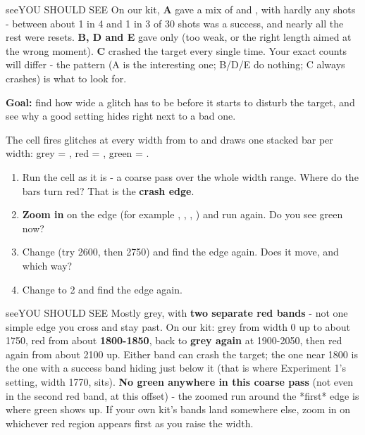 \documentclass[11pt,letterpaper]{article}
\begin{document}
\vspace{4pt}

\begin{guidecallout}{see}{YOU SHOULD SEE}
On our kit, \textbf{A} gave a mix of  and , with hardly any  shots - between
about 1 in 4 and 1 in 3 of 30 shots was a success, and nearly all the rest were resets. \textbf{B, D and E} gave only
 (too weak, or the right length aimed at the wrong moment). \textbf{C} crashed the target every single
time. Your exact counts will differ - the pattern (A is the interesting one; B/D/E do nothing; C always crashes) is
what to look for.
\end{guidecallout}


\textbf{Goal:} find how wide a glitch has to be before it starts to disturb the target, and see why a good setting
hides right next to a bad one.

The cell fires  glitches at every width from  to  and draws one
stacked bar per width: grey = , red = , green = .

\begin{enumerate}[label=\arabic*.,leftmargin=1.8em,itemsep=2pt,topsep=2pt,parsep=0pt,start=1]
\item Run the cell as it is - a coarse pass over the whole width range. Where do the bars turn red? That is the \textbf{crash edge}.
\item \textbf{Zoom in} on the edge (for example , , , ) and run again. Do you see green now?
\item Change  (try 2600, then 2750) and find the edge again. Does it move, and which way?
\item Change  to 2 and find the edge again.
\end{enumerate}

\begin{guidecallout}{see}{YOU SHOULD SEE}
Mostly grey, with \textbf{two separate red bands} - not one simple edge you cross and stay past. On our kit: grey from
width 0 up to about 1750, red from about \textbf{1800-1850}, back to \textbf{grey again} at 1900-2050, then red again
from about 2100 up. Either band can crash the target; the one near 1800 is the one with a success band hiding just
below it (that is where Experiment 1's setting, width 1770, sits). \textbf{No green anywhere in this coarse pass} (not
even in the second red band, at this offset) - the zoomed run around the *first* edge is where green shows up. If your
own kit's bands land somewhere else, zoom in on whichever red region appears first as you raise the width.
\end{guidecallout}
\end{document}
